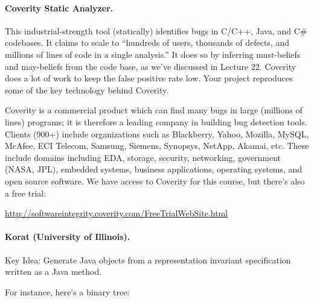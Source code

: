 \documentclass[11pt]{article}
\begin{document}
\paragraph{Coverity Static Analyzer.} 
This industrial-strength tool (statically) identifies bugs in C/C++,
Java, and C\# codebases. It claims to scale to ``hundreds of users,
thousands of defects, and millions of lines of code in a single
analysis.'' It does so by inferring must-beliefs and may-beliefs from
the code base, as we've discussed in Lecture 22. Coverity does a lot
of work to keep the false positive rate low. Your project reproduces some 
of the key technology behind Coverity.

Coverity is a commercial product which can find many bugs in large
(millions of lines) programs; it is therefore a leading company in
building bug detection tools. Clients (900+) include organizations
such as Blackberry, Yahoo, Mozilla, MySQL, McAfee, ECI Telecom,
Samsung, Siemens, Synopsys, NetApp, Akamai, etc. These include domains
including EDA, storage, security, networking, government (NASA, JPL),
embedded systems, business applications, operating systems, and open
source software.  We have access to Coverity for this course, but
there's also a free trial:
\begin{center}
  \url{http://softwareintegrity.coverity.com/FreeTrialWebSite.html}
\end{center}


\paragraph{Korat (University of Illinois).}
Key Idea: Generate Java objects from a representation invariant specification
written as a Java method.

For instance, here's a binary tree: 

\begin{center}
\end{center}
\end{document}

